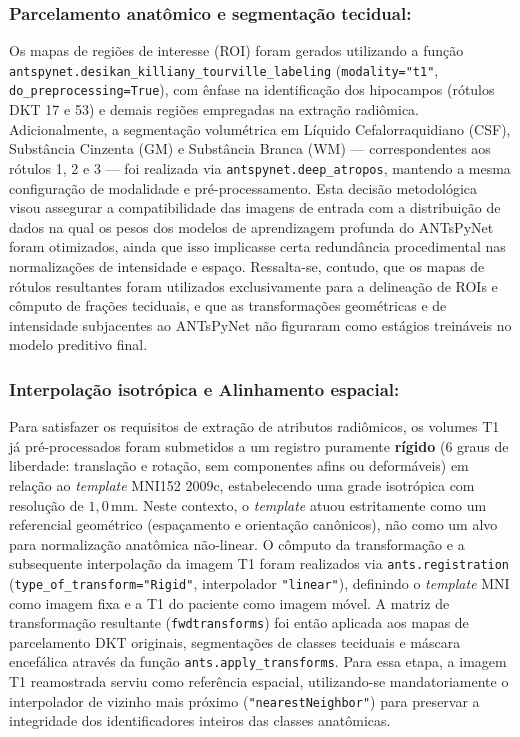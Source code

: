 \documentclass[review]{elsarticle}
\newcommand{\code}[1]{\texttt{#1}}
\begin{document}
\subsubsection{Parcelamento anatômico e segmentação tecidual:} Os mapas de regiões de interesse (ROI) foram gerados utilizando a função \code{antspynet.desikan\_killiany\_tourville\_labeling} \cite{tustison-2021} (\code{modality="t1"}, \code{do\_preprocessing=True}), com ênfase na identificação dos hipocampos (rótulos DKT 17 e 53) e demais regiões empregadas na extração radiômica. Adicionalmente, a segmentação volumétrica em Líquido Cefalorraquidiano (CSF), Substância Cinzenta (GM) e Substância Branca (WM) — correspondentes aos rótulos 1, 2 e 3 — foi realizada via \code{antspynet.deep\_atropos}, mantendo a mesma configuração de modalidade e pré-processamento. Esta decisão metodológica visou assegurar a compatibilidade das imagens de entrada com a distribuição de dados na qual os pesos dos modelos de aprendizagem profunda do ANTsPyNet foram otimizados, ainda que isso implicasse certa redundância procedimental nas normalizações de intensidade e espaço. Ressalta-se, contudo, que os mapas de rótulos resultantes foram utilizados exclusivamente para a delineação de ROIs e cômputo de frações teciduais, e que as transformações geométricas e de intensidade subjacentes ao ANTsPyNet não figuraram como estágios treináveis no modelo preditivo final.

\subsubsection{Interpolação isotrópica e Alinhamento espacial:} Para satisfazer os requisitos de extração de atributos radiômicos, os volumes T1 já pré-processados foram submetidos a um registro puramente \textbf{rígido} (6 graus de liberdade: translação e rotação, sem componentes afins ou deformáveis) em relação ao \emph{template} MNI152 2009c, estabelecendo uma grade isotrópica com resolução de \(1{,}0\)\,mm. Neste contexto, o \emph{template} atuou estritamente como um referencial geométrico (espaçamento e orientação canônicos), não como um alvo para normalização anatômica não-linear. O cômputo da transformação e a subsequente interpolação da imagem T1 foram realizados via \code{ants.registration} (\code{type\_of\_transform="Rigid"}, interpolador \code{"linear"}), definindo o \emph{template} MNI como imagem fixa e a T1 do paciente como imagem móvel. A matriz de transformação resultante (\code{fwdtransforms}) foi então aplicada aos mapas de parcelamento DKT originais, segmentações de classes teciduais e máscara encefálica  através da função \code{ants.apply\_transforms}. Para essa etapa, a imagem T1 reamostrada serviu como referência espacial, utilizando-se mandatoriamente o interpolador de vizinho mais próximo (\code{"nearestNeighbor"}) para preservar a integridade dos identificadores inteiros das classes anatômicas. 
\end{document}

